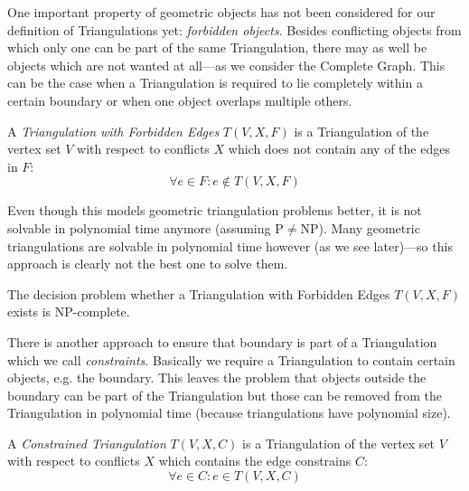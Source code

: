 One important property of geometric objects has not been considered
for our definition of Triangulations yet: \emph{forbidden objects}.
Besides conflicting objects
from which only one can be part of the same Triangulation, there may
as well be objects which are not wanted at all---as we consider the
Complete Graph. This can be the case when a Triangulation is required
to lie completely within a certain boundary or when one object
overlaps multiple others.

\begin{definition}
  \label{def:triangulation_forbidden_edges}
  A \emph{Triangulation with Forbidden Edges} \(T(V,X,F)\) is a 
  Triangulation of the vertex set \(V\) with respect to conflicts
  \(X\) which does not contain any of the edges in \(F\):
  \[ \forall e \in F : e \not\in T(V,X,F) \]
\end{definition}

Even though this  models
geometric triangulation problems better, it is not solvable in
polynomial time anymore (assuming P\(\not=\)NP). Many geometric
triangulations are solvable in polynomial time however (as we see
later)---so this approach is clearly not the best one to solve them.

\begin{theorem}
  The decision problem whether 
  a Triangulation with Forbidden Edges \(T(V,X,F)\) exists
  is NP-complete.
  \cite[triangulation existence problem]{triangulation_forbidden_edges}
\end{theorem}

There is another approach to ensure that boundary is part of a
Triangulation which we call \emph{constraints}. Basically we require
a Triangulation to contain certain objects, e.g. the boundary. This
leaves the problem that objects outside the boundary can be part of
the Triangulation but those can be removed from the Triangulation
in polynomial time (because triangulations have polynomial size).

\begin{definition}
  \label{def:constrained_triangulation}
  A \emph{Constrained Triangulation} \(T(V,X,C)\) is a Triangulation
  of the vertex set \(V\) with respect to conflicts \(X\) which 
  contains the edge constrains \(C\):
  \[ \forall e \in C : e \in T(V,X,C) \]
\end{definition}

